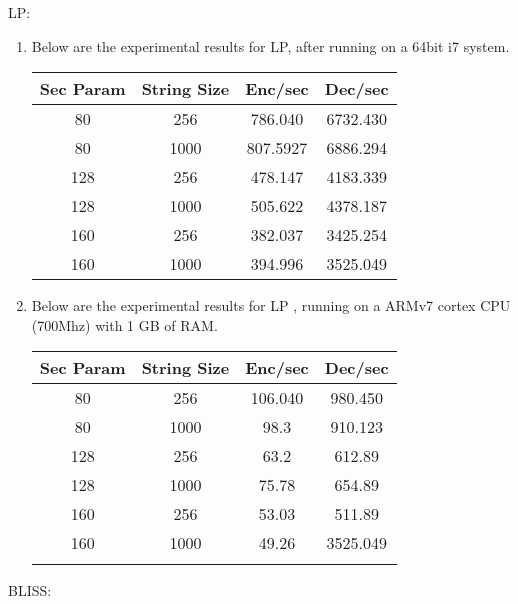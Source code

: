 \documentclass[conference]{IEEEtran}
\begin{document}
\begin{enumerate}
\begin{enumerate}
\begin{center}
\begin{tabular}{||c c c c||}
\hline
\end{tabular}
\end{center}

\end{enumerate}

LP:
\begin{enumerate}

\item { Below are the experimental results for LP, after running on a 64bit i7 system. }
\begin{center}
\small
\begin{tabular}{||c c c c||} 
\hline
Sec Param & String Size & Enc/sec & Dec/sec \\ [0.4ex] 
\hline\hline
80 & 256 & 786.040 & 6732.430 \\ 
\hline
80 & 1000 & 807.5927  & 6886.294\\
\hline
128 & 256 & 478.147 & 4183.339 \\
\hline
128 & 1000 & 505.622 & 4378.187\\
\hline
160 & 256 & 382.037 & 3425.254\\
\hline
160 & 1000 & 394.996 & 3525.049\\
\hline
\end{tabular}
\end{center}

\item {Below are the experimental results for LP , running on a ARMv7 cortex CPU (700Mhz) with 1 GB of RAM. }

\begin{center}
\small
\begin{tabular}{||c c c c||} 
\hline
Sec Param & String Size & Enc/sec & Dec/sec \\ [0.4ex] 
\hline\hline
80 & 256 & 106.040 & 980.450 \\ 
\hline
80 & 1000 & 98.3  & 910.123\\
\hline
128 & 256 & 63.2 & 612.89 \\
\hline
128 & 1000 & 75.78 & 654.89\\
\hline
160 & 256 & 53.03 & 511.89\\
\hline
160 & 1000 & 49.26 & 3525.049\\
 &  &  & \\
\hline
\end{tabular}
\end{center}

\end{enumerate}

BLISS:


\end{enumerate}
\end{document}
